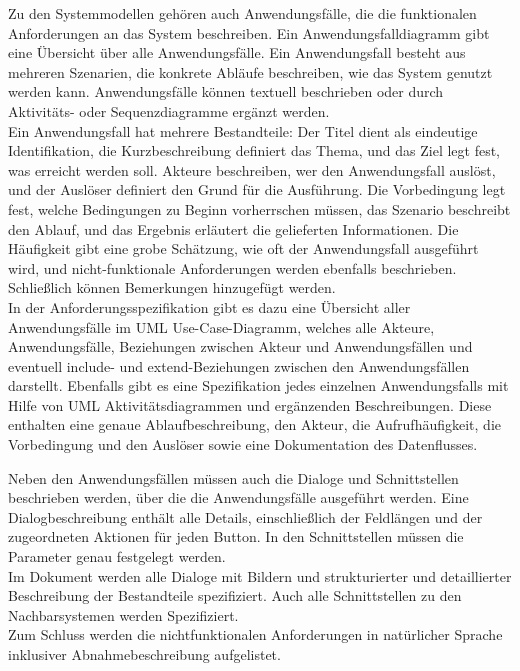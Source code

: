 Zu den Systemmodellen gehören auch Anwendungsfälle, die die funktionalen Anforderungen an das System beschreiben. 
Ein Anwendungsfalldiagramm gibt eine Übersicht über alle Anwendungsfälle. Ein Anwendungsfall besteht aus mehreren 
Szenarien, die konkrete Abläufe beschreiben, wie das System genutzt werden kann. Anwendungsfälle können textuell 
beschrieben oder durch Aktivitäts- oder Sequenzdiagramme ergänzt werden.\\
Ein Anwendungsfall hat mehrere Bestandteile: Der Titel dient als eindeutige Identifikation, die Kurzbeschreibung 
definiert das Thema, und das Ziel legt fest, was erreicht werden soll. Akteure beschreiben, wer den Anwendungsfall 
auslöst, und der Auslöser definiert den Grund für die Ausführung. Die Vorbedingung legt fest, welche Bedingungen zu 
Beginn vorherrschen müssen, das Szenario beschreibt den Ablauf, und das Ergebnis erläutert die gelieferten 
Informationen. Die Häufigkeit gibt eine grobe Schätzung, wie oft der Anwendungsfall ausgeführt wird, und 
nicht-funktionale Anforderungen werden ebenfalls beschrieben. Schließlich können Bemerkungen hinzugefügt werden.\\
In der Anforderungsspezifikation gibt es dazu eine Übersicht aller Anwendungsfälle im UML Use-Case-Diagramm, welches 
alle Akteure, Anwendungsfälle, Beziehungen zwischen Akteur und Anwendungsfällen und eventuell include- und extend-Beziehungen
zwischen den Anwendungsfällen darstellt. Ebenfalls gibt es eine Spezifikation jedes einzelnen Anwendungsfalls mit Hilfe 
von UML Aktivitätsdiagrammen und ergänzenden Beschreibungen. Diese enthalten eine genaue Ablaufbeschreibung, den Akteur, 
die Aufrufhäufigkeit, die Vorbedingung und den Auslöser sowie eine Dokumentation des Datenflusses. 

Neben den Anwendungsfällen müssen auch die Dialoge und Schnittstellen beschrieben werden, über die die Anwendungsfälle 
ausgeführt werden. Eine Dialogbeschreibung enthält alle Details, einschließlich der Feldlängen und der zugeordneten 
Aktionen für jeden Button. In den Schnittstellen müssen die Parameter genau festgelegt werden.\\
Im Dokument werden alle Dialoge mit Bildern und strukturierter und detaillierter Beschreibung der Bestandteile spezifiziert.
Auch alle Schnittstellen zu den Nachbarsystemen werden Spezifiziert.\\

Zum Schluss werden die nichtfunktionalen Anforderungen in natürlicher Sprache inklusiver Abnahmebeschreibung aufgelistet.

